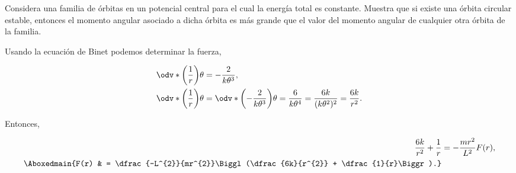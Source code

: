 \documentclass[../main.tex]{subfiles}
\begin{document}
\begin{problema}
	Considera una familia de órbitas en un potencial central
	para el cual la energía total es constante. Muestra que si
	existe una órbita circular estable, entonces el momento angular
	asociado a dicha órbita es más grande que el valor del momento
	angular de cualquier otra órbita de la familia.
\end{problema}

\startsolution

Usando la ecuación de Binet podemos determinar la fuerza,

\begin{align*}
	\odv*{\biggl(\dfrac{1}{r}\biggr)}{\theta} & = -\dfrac{2}{k\theta^{3}},                                                                                                           \\
	\odv*{\biggl(\dfrac{1}{r}\biggr)}{\theta} & = \odv*{\biggl(-\dfrac{2}{k\theta^{3}}\biggr)}{\theta} = \dfrac{6}{k\theta^{4}} = \dfrac{6k}{(k\theta^{2})^{2}} = \dfrac{6k}{r^{2}}.
\end{align*}

Entonces,

\begin{align}
	\dfrac{6k}{r^{2}} + \dfrac{1}{r} & = -\dfrac{mr^{2}}{L^{2}}F(r),                                            \\
	\Aboxedmain{F(r)                 & = \dfrac{-L^{2}}{mr^{2}}\Biggl(\dfrac{6k}{r^{2}} + \dfrac{1}{r}\Biggr).}
\end{align}
\end{document}
